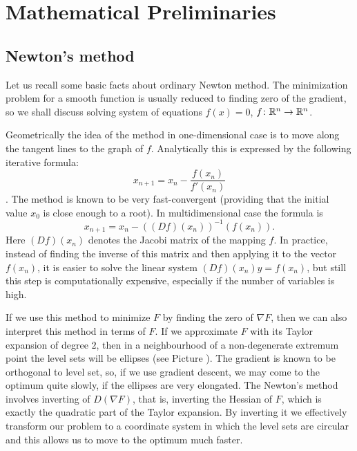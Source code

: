 \section{Mathematical Preliminaries}


\subsection{Newton's method}

Let us recall some basic facts about ordinary Newton method. The minimization problem for 
a smooth function is usually reduced to finding zero of the gradient, 
so we shall discuss solving system of equations
$f(x) = 0$, $f \colon \mathbb{R}^n \to \mathbb{R}^n$.

 Geometrically the idea of the method in one-dimensional case is 
to move along the tangent lines to the graph of $f$. Analytically this is expressed by the following iterative formula:
$$ x_{n+1} = x_n - \frac{f(x_n) }{ f'(x_{n})} $$.
The method is known to be very fast-convergent (providing that the initial value $x_0$ is close enough to a root).
In multidimensional case the formula is
\begin{equation}
 x_{n+1} = x_n - ((Df)(x_n))^{-1} ( f(x_n) ).
\end{equation}
Here $(Df)(x_n)$ denotes the Jacobi matrix of the mapping $f$. In practice, instead of finding
the inverse of this matrix and then applying it to the vector $f(x_n)$, it is 
easier to solve the linear system $(Df)(x_n) y = f(x_n) $, but still this step is computationally expensive,
especially if the number of variables is high.


If we use this method to minimize $F$ by finding the zero of $\nabla F$, then
we can also interpret this method in terms of $F$. If we approximate $F$
with its Taylor expansion of degree $2$, then in a neighbourhood 
of a non-degenerate extremum point the level sets will be ellipses (see Picture ).
The gradient is known to be orthogonal to level set, so, if we use gradient descent,
we may come to the optimum quite slowly, if the ellipses are very elongated.
The Newton's method involves inverting of $D (\nabla F)$, that is, inverting 
the Hessian of $F$, which is exactly the quadratic part of the Taylor expansion.
By inverting it we effectively transform our problem to a coordinate system in which
the level sets are circular and this allows us to move to the optimum much faster.

